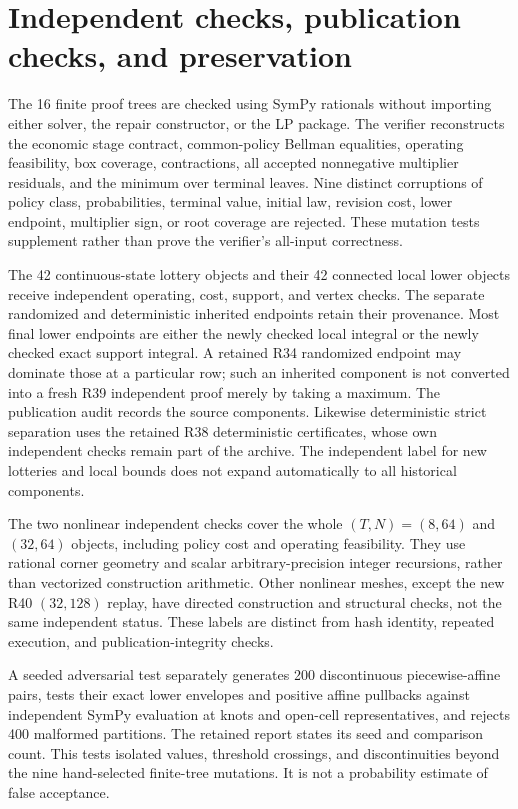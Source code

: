 \section{Independent checks, publication checks, and preservation}
The 16 finite proof trees are checked using SymPy rationals without importing either solver, the repair constructor, or the LP package. The verifier reconstructs the economic stage contract, common-policy Bellman equalities, operating feasibility, box coverage, contractions, all accepted nonnegative multiplier residuals, and the minimum over terminal leaves. Nine distinct corruptions of policy class, probabilities, terminal value, initial law, revision cost, lower endpoint, multiplier sign, or root coverage are rejected. These mutation tests supplement rather than prove the verifier's all-input correctness.

The 42 continuous-state lottery objects and their 42 connected local lower objects receive independent operating, cost, support, and vertex checks. The separate randomized and deterministic inherited endpoints retain their provenance. Most final lower endpoints are either the newly checked local integral or the newly checked exact support integral. A retained R34 randomized endpoint may dominate those at a particular row; such an inherited component is not converted into a fresh R39 independent proof merely by taking a maximum. The publication audit records the source components. Likewise deterministic strict separation uses the retained R38 deterministic certificates, whose own independent checks remain part of the archive. The independent label for new lotteries and local bounds does not expand automatically to all historical components.

The two nonlinear independent checks cover the whole $(T,N)=(8,64)$ and $(32,64)$ objects, including policy cost and operating feasibility. They use rational corner geometry and scalar arbitrary-precision integer recursions, rather than vectorized construction arithmetic. Other nonlinear meshes, except the new R40 $(32,128)$ replay, have directed construction and structural checks, not the same independent status. These labels are distinct from hash identity, repeated execution, and publication-integrity checks.

A seeded adversarial test separately generates 200 discontinuous piecewise-affine pairs, tests their exact lower envelopes and positive affine pullbacks against independent SymPy evaluation at knots and open-cell representatives, and rejects 400 malformed partitions. The retained report states its seed and comparison count. This tests isolated values, threshold crossings, and discontinuities beyond the nine hand-selected finite-tree mutations. It is not a probability estimate of false acceptance.

